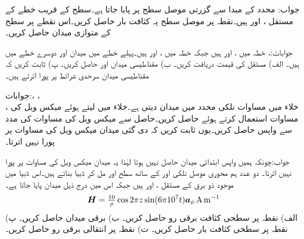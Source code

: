 جواب:
محدد کے مبدا سے گزرتی موصل سطح پر  پایا جاتا ہے۔سطح کے قریب خطے کے مستقل ،  اور  ہیں۔نقطہ  پر موصل سطح پہ کثافت بار حاصل کریں۔اس نقطے پر سطح کے متوازی میدان حاصل کریں۔

جوابات:، 
خطہ  میں ،  اور  ہیں جبکہ خطہ  میں ،  اور  ہیں۔پہلے خطے میں میدان  اور دوسرے خطے میں  ہیں۔ الف) مستقل  کی قیمت دریافت کریں۔ ب) مقناطیسی میدان  اور  حاصل کریں۔ پ) ثابت کریں کہ مقناطیسی میدان سرحدی شرائط پر پورا اترتے ہیں۔

جوابات:، ،\\
  ،
خلاء میں مساوات  نلکی محدد میں میدان دیتی ہے۔خلاء میں  لیتے ہوئے میکس ویل کی مساوات  استعمال کرتے ہوئے  حاصل کریں۔حاصل  سے میکس ویل کی مساوات  کی مدد سے  واپس  حاصل کریں۔یوں ثابت کریں کہ دی گئی میدان میکس ویل کی مساوات پر پورا نہیں اترتا۔ 

جواب:چونکہ ہمیں واپس ابتدائی میدان حاصل نہیں ہوتا لہٰذا یہ میدان میکس ویل کی مساوات پر پورا نہیں اترتا۔
دو عدد ہم محوری موصل نلکی  اور   کے ساتھ سطح   اور  مل کر ڈبیا بناتے ہیں۔اس ڈبیا میں موجود ذو برق کے مستقل ،  اور  ہیں جبکہ اس میں درج ذیل میدان پایا جاتا ہے۔
\begin{align*}
{\ensuremath{{\boldsymbol{H}}}}=\tfrac{10}{\rho}\cos 2\pi z \sin (6\pi 10^7 t) {\boldsymbol{a}}_{\phi} \, \si{\ampere\per\meter}
\end{align*}
الف) نقطہ  پر سطحی کثافت برقی رو حاصل کریں۔ ب) برقی میدان  حاصل کریں۔ پ) نقطہ  پر سطحی کثافت بار حاصل کریں۔ ت) نقطہ  پر انتقالی برقی رو حاصل کریں۔

